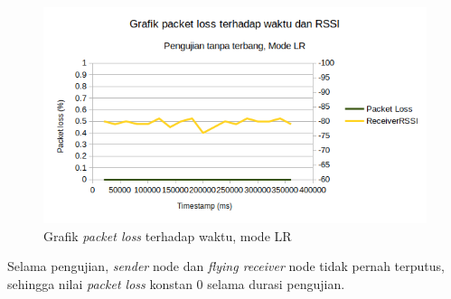 \begin{figure}[H]
	\centering
	\includegraphics[scale=0.7]{./assets/Graphs/NoFly_LR/PacketLoss-Time}
	\caption{Grafik \textit{packet loss} terhadap waktu, mode LR}
\end{figure}
Selama pengujian, \textit{sender} node dan \textit{flying receiver} node tidak pernah terputus, sehingga nilai \textit{packet loss} konstan 0 selama durasi pengujian.

